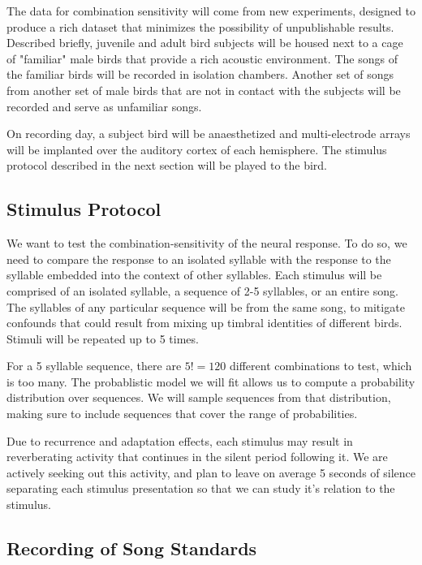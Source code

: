\documentclass[12pt,article,oneside]{memoir}
\begin{document}
The data for combination sensitivity will come from new experiments, designed to produce a rich
dataset that minimizes the possibility of unpublishable results. Described briefly, juvenile and
adult bird subjects will be housed next to a cage of "familiar" male birds that provide a rich
acoustic environment. The songs of the familiar birds will be recorded in isolation chambers. Another
set of songs from another set of male birds that are not in contact with the subjects will be recorded
and serve as unfamiliar songs.

On recording day, a subject bird will be anaesthetized and multi-electrode arrays will be implanted
over the auditory cortex of each hemisphere. The stimulus protocol described in the next section will
be played to the bird.

\subsection{Stimulus Protocol}
\label{sec:stimulus_protocol}

We want to test the combination-sensitivity of the neural response. To do so, we need to compare
the response to an isolated syllable with the response to the syllable embedded into the context
of other syllables. Each stimulus will be comprised of an isolated syllable, a sequence of 2-5
syllables, or an entire song. The syllables of any particular sequence will be from the same
song, to mitigate confounds that could result from mixing up timbral identities of
different birds. Stimuli will be repeated up to 5 times.

For a 5 syllable sequence, there are $5!=120$ different combinations to test, which is too many. 
The probablistic model we will fit allows us to compute a probability distribution over sequences.
We will sample sequences from that distribution, making sure to include sequences that cover the
range of probabilities.

Due to recurrence and adaptation effects, each stimulus may result in reverberating activity
that continues in the silent period following it. We are actively seeking out this activity,
and plan to leave on average 5 seconds of silence separating each stimulus presentation so that
we can study it's relation to the stimulus.

\subsection{Recording of Song Standards}
\end{document}
